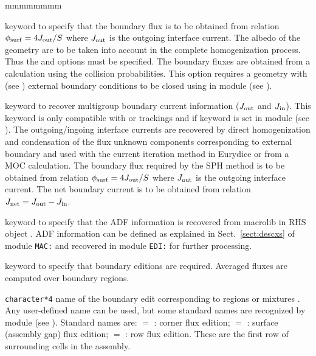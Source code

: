 \begin{ListeDeDescription}{mmmmmmmm}
\item[\moc{ALBS}] keyword to specify that the boundary flux is to be obtained from relation
$\phi_{\rm surf}=4J_{\rm out}/S$ where $J_{\rm out}$ is the outgoing interface current. The albedo of
the geometry are to be taken into account in the complete homogenization process. Thus the 
and  options must be specified. The boundary fluxes are obtained from a calculation using the collision
probabilities. This option requires a geometry with  (see ) external boundary conditions to
be closed using  in module  (see ).\cite{ALSB2}

\item[\moc{JOUT}] keyword to recover multigroup boundary current information ($J_{\rm out}$ and $J_{\rm in}$). This keyword
is only compatible with  or  trackings and if keyword  is set in module 
(see ). The outgoing/ingoing interface currents are recovered by direct homogenization and condensation of the
flux unknown components corresponding to external boundary and used with the current iteration method in Eurydice or from a MOC
calculation. The boundary flux required by the SPH method is to be obtained from relation $\phi_{\rm surf}=4J_{\rm out}/S$ where
$J_{\rm out}$ is the outgoing interface current. The net boundary current is to be obtained from relation
$J_{\rm net}=J_{\rm out}-J_{\rm in}$.

\item[\moc{ADFM}] keyword to specify that the ADF information is recovered from macrolib in RHS object . ADF information can
be defined as explained in Sect.~\ref{sect:descxs} of module {\tt MAC:} and recovered in module {\tt EDI:} for further processing.

\item[\moc{ADF}] keyword to specify that boundary editions are required. Averaged fluxes are
computed over boundary regions.

\item[\dusa{TYPE}] {\tt character*4} name of the boundary edit corresponding to
regions  or mixtures . Any user-defined name can be used, but some
standard names are recognized by module  (see ). Standard names are: $=$ :
corner flux edition; $=$ : surface (assembly gap) flux edition; $=$ :
row flux edition. These are the first row of surrounding cells in the assembly.


\end{ListeDeDescription}
